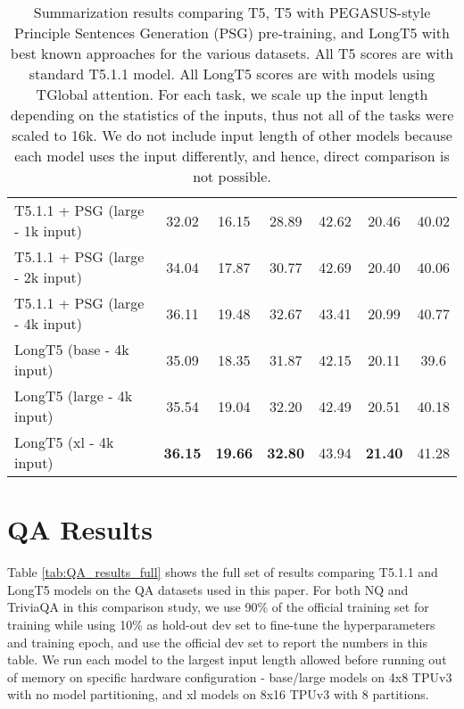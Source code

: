 \documentclass[11pt]{article}
\begin{document}
\begin{table*}
\begin{tabular}{lcccccc}
T5.1.1 + PSG (large - 1k input) & 32.02 & 16.15 & 28.89 & 42.62 & 20.46 & 40.02 \\
T5.1.1 + PSG (large - 2k input) & 34.04 & 17.87 & 30.77 & 42.69 & 20.40 & 40.06 \\
T5.1.1 + PSG (large - 4k input) & 36.11 & 19.48 & 32.67 & 43.41 & 20.99 & 40.77 \\
LongT5 (base - 4k input) & 35.09 & 18.35 & 31.87 & 42.15 & 20.11 & 39.6 \\
LongT5 (large - 4k input) & 35.54 & 19.04 & 32.20 & 42.49 & 20.51 & 40.18 \\
LongT5 (xl - 4k input) & \textbf{36.15} & \textbf{19.66} & \textbf{32.80} & 43.94 & \textbf{21.40} & 41.28 \\
\bottomrule
\end{tabular}
\caption{Summarization results comparing T5, T5 with PEGASUS-style Principle Sentences Generation (PSG) pre-training, and LongT5 with best known approaches for the various datasets. All T5 scores are with standard T5.1.1 model. All LongT5 scores are with models using TGlobal attention. For each task, we scale up the input length depending on the statistics of the inputs, thus not all of the tasks were scaled to 16k. We do not include input length of other models because each model uses the input differently, and hence, direct comparison is not possible.}
\label{tab:summarization_full_results}
\end{table*}

\section{QA Results}\label{sec:qa_appendix}

Table \ref{tab:QA_results_full} shows the full set of results comparing T5.1.1 and LongT5 models on the QA datasets used in this paper. For both NQ and TriviaQA in this comparison study, we use 90\% of the official training set for training while using 10\% as hold-out dev set to fine-tune the hyperparameters and training epoch, and use the official dev set to report the numbers in this table. We run each model to the largest input length allowed before running out of memory on specific hardware configuration - base/large models on 4x8 TPUv3 with no model partitioning, and xl models on 8x16 TPUv3 with 8 partitions.
\end{document}
